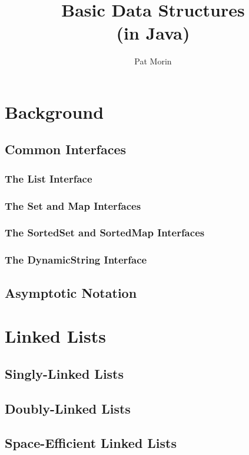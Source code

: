 \documentclass{book}
\title{Basic Data Structures\\(in Java)}
\author{Pat Morin}
\begin{document}
\begin{titlepage}
\maketitle
\thispagestyle{empty}
\end{titlepage}

\tableofcontents

\chapter{Background}

\section{Common Interfaces}
\subsection{The List Interface}
\subsection{The Set and Map Interfaces}
\subsection{The SortedSet and SortedMap Interfaces}
\subsection{The DynamicString Interface}
\section{Asymptotic Notation}



\chapter{Linked Lists}
\section{Singly-Linked Lists}
\section{Doubly-Linked Lists}
\section{Space-Efficient Linked Lists}
\end{document}
